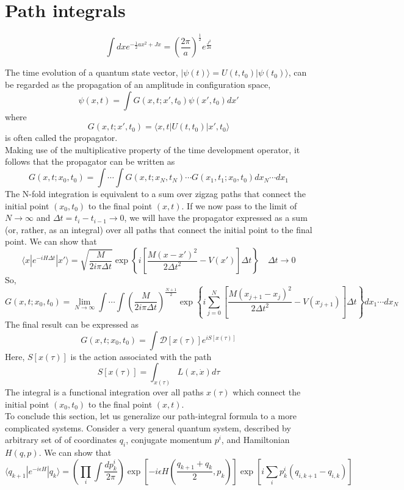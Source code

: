 \section{Path integrals}
\begin{newthem}
\[\int dx e^{-\frac{1}{2} ax^2 + Jx} = \left( \frac{2\pi}{a}\right)^{\frac{1}{2}} e^{\frac{J^2}{2a}}\]
\end{newthem}
The time evolution of a quantum state vector, $|\psi(t)\rangle = U(t,t_0)| \psi(t_0)\rangle$, can be regarded as the propagation of an amplitude in configuration space,
\[\psi(x,t) = \int G(x,t;x',t_0) \psi(x',t_0)dx'\]
where
\[G(x,t;x',t_0) = \langle x,t | U(t,t_0) | x',t_0 \rangle\]
is often called the propagator. \\
Making use of the multiplicative property of the time development operator, it follows that the propagator can be written as
\[G(x,t;x_0,t_0) = \int \cdots \int G(x,t;x_N,t_N) \cdots G(x_1,t_1;x_0,t_0) dx_N \cdots dx_1\]
The N-fold integration is equivalent to a sum over zigzag paths that connect the initial point $(x_0,t_0)$ to the final point $(x,t)$. If we now pass to the limit of $N \to \infty$ and $\Delta t = t_i - t_{i-1} \to 0$, we will have the propagator expressed as a sum (or, rather, as an integral) over all paths
that connect the initial point to the final point.
We can show that
\[\langle x | e^{-iH \Delta t} | x' \rangle = \sqrt{\frac{M}{2i\pi\Delta t}} \exp \left\{ i\left[ \frac{M(x-x')^2}{2\Delta t^2}   -V(x') \right] \Delta t \right\} \quad \Delta t \to 0 \]
So,
\[G(x,t;x_0,t_0) = \lim_{N \to \infty} \int \cdots \int \left(\frac{M}{2i\pi\Delta t}\right)^{\frac{N+1}{2}} \exp \left\{ i \sum_{j=0}^{N}\left[ \frac{M(x_{j+1}-x_{j})^2}{2\Delta t^2}   -V(x_{j+1}) \right] \Delta t \right\} dx_1 \cdots dx_N\]
The final result can be expressed as
\[G(x,t;x_0,t_0) = \int \mathcal{D}[x(\tau)] e^{iS[x(\tau)]}\]
Here, $S[x(\tau)]$ is the action associated with the path
\[S[x(\tau)] = \int_{x(\tau)} L(x,\dot{x}) d\tau\]
The integral is a functional integration over all paths $x(\tau)$ which connect the initial point $(x_0,t_0)$ to the final point $(x,t)$.\\
To conclude this section, let us generalize our path-integral formula to a more complicated systems. Consider a very general quantum system, described by arbitrary set of of coordinates $q_i$, conjugate momentum $p^i$, and Hamiltonian $H(q,p)$. 
We can show that
\[\langle q_{k+1} | e^{-i\epsilon H} | q_{k}\rangle = \left( \prod_i \int \frac{dp^i_k}{2\pi}\right) \exp \left[ -i\epsilon H \left( \frac{q_{k+1}+q_{k}}{2},p_k\right) \right] \exp \left[ i \sum_i p_k^i (q_{i,k+1} - q_{i,k})\right] \] 
